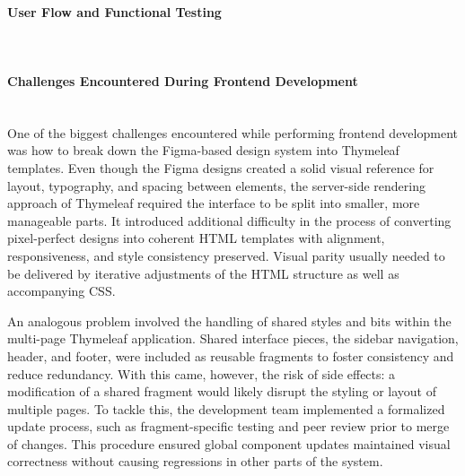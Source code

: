\paragraph{User Flow and Functional Testing}\mbox{}\\

\paragraph{Challenges Encountered During Frontend Development}\mbox{}\\
One of the biggest challenges encountered while performing frontend development was how to break down the Figma-based design system into Thymeleaf templates. Even though the Figma designs created a solid visual reference for layout, typography, and spacing between elements, the server-side rendering approach of Thymeleaf required the interface to be split into smaller, more manageable parts. It introduced additional difficulty in the process of converting pixel-perfect designs into coherent HTML templates with alignment, responsiveness, and style consistency preserved. Visual parity usually needed to be delivered by iterative adjustments of the HTML structure as well as accompanying CSS.

An analogous problem involved the handling of shared styles and bits within the multi-page Thymeleaf application. Shared interface pieces, the sidebar navigation, header, and footer, were included as reusable fragments to foster consistency and reduce redundancy. With this came, however, the risk of side effects: a modification of a shared fragment would likely disrupt the styling or layout of multiple pages. To tackle this, the development team implemented a formalized update process, such as fragment-specific testing and peer review prior to merge of changes. This procedure ensured global component updates maintained visual correctness without causing regressions in other parts of the system.
